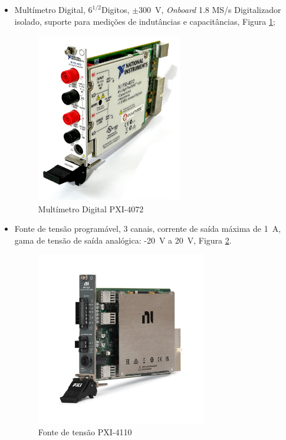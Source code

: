 \begin{itemize}
    \item Multímetro Digital, \(6^{1/2} \)Digitos, \(\pm\)\SI{300}{\volt}, \textit{Onboard} 1.8 MS/s Digitalizador isolado, suporte para medições de indutâncias e capacitâncias, Figura \ref{fig:PXI-4072};
        \begin{figure}[hbtp]
                \centering
                \includegraphics[width=0.6\textwidth]{figures/PXI-4072.png}
                \caption{Multímetro Digital PXI-4072 \cite{PXI-4072}}
                \label{fig:PXI-4072}
        \end{figure}
    \item Fonte de tensão programável, 3 canais, corrente de saída máxima de \SI{1}{\ampere}, gama de tensão de saída analógica: -\SI{20}{\volt} a \SI{20}{\volt}, Figura {\ref{fig:PXI-4110}}.
    \begin{figure}[hbtp]
                \centering
                \includegraphics[width=0.7\textwidth]{figures/PXI-4110.png}
                \caption{Fonte de tensão PXI-4110 \cite{PXI-4110}}
                \label{fig:PXI-4110}
        \end{figure}
\end{itemize}

